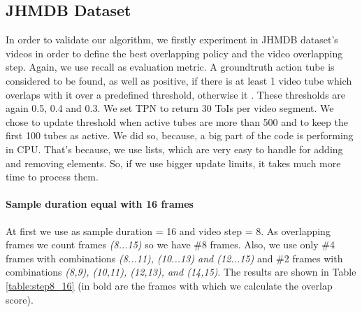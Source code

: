 \subsection{JHMDB Dataset}

In order to validate our algorithm, we firstly experiment in JHMDB dataset's videos in order to define the best overlapping policy and
the video overlapping step. Again, we use recall as evaluation metric. A groundtruth action tube is considered to be found, as well as positive,
if there is at least 1 video tube which overlaps with it over a predefined threshold, otherwise it .  These thresholds are again 0.5, 0.4 and 0.3.
We set TPN to return 30 ToIs per video segment.
We chose to update threshold when active tubes are more than 500 and to keep the first 100 tubes as active. We did so, because, a big part of the
code is performing in CPU. That's because, we use lists, which are very easy to handle for adding and removing elements. So, if we use bigger update
limits, it takes much more time to process them.

\paragraph{Sample duration equal with 16 frames} At first we use as sample duration = 16 and video step = 8. As overlapping frames we count frames
\textit{(8...15)} so we have \#8 frames. Also, we use only \#4 frames with combinations \textit{(8...11), (10...13) and (12...15)} and 
\#2 frames with combinations \textit{(8,9), (10,11), (12,13), and (14,15)}. The results are shown in Table \ref{table:step8_16} (in bold are
the frames with which we calculate the overlap score).

